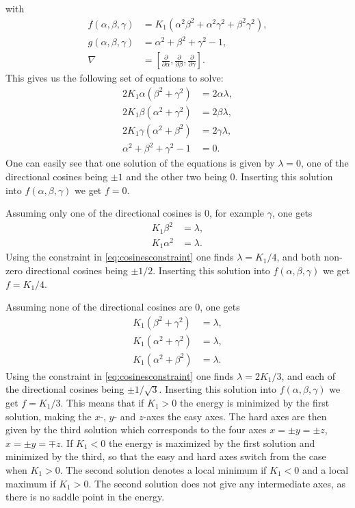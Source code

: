 \documentclass[12pt, a4paper, twoside, openright]{article}		%
\numberwithin{equation}{section}
\begin{document}
with
\begin{align}
f(\alpha, \beta, \gamma) &= K_1 (\alpha^2\beta^2+\alpha^2\gamma^2+\beta^2\gamma^2), \\
g(\alpha, \beta, \gamma) &= \alpha^2+\beta^2+\gamma^2 - 1,\\
\nabla &= \left[\frac{\partial}{\partial\alpha}, \frac{\partial}{\partial\beta}, \frac{\partial}{\partial\gamma}\right].
\end{align}
This gives us the following set of equations to solve:
\begin{align*}
2K_1\alpha (\beta^2+\gamma^2) &= 2\alpha\lambda, \\ 
2K_1\beta (\alpha^2+\gamma^2) &= 2\beta\lambda, \\ 
2K_1\gamma (\alpha^2+\beta^2) &= 2\gamma\lambda, \\ 
\alpha^2+\beta^2+\gamma^2 - 1 &= 0.
\end{align*}
One can easily see that one solution of the equations is given by $\lambda = 0$, one of the directional cosines being $\pm 1$ and the other two being 0. Inserting this solution into $f(\alpha, \beta, \gamma)$ we get $f = 0$.

Assuming only one of the directional cosines is 0, for example $\gamma$, one gets
\begin{align*}
K_1 \beta^2 &= \lambda, \\ 
K_1 \alpha^2 &= \lambda.
\end{align*}
Using the constraint in \eqref{eq:cosinesconstraint} one finds $\lambda = K_1/4$, and both non-zero directional cosines being $\pm 1/2$. Inserting this solution into $f(\alpha, \beta, \gamma)$ we get $f = K_1/4$.

Assuming none of the directional cosines are 0, one gets
\begin{align*}
K_1 (\beta^2+\gamma^2) &= \lambda, \\ 
K_1 (\alpha^2+\gamma^2) &= \lambda, \\ 
K_1 (\alpha^2+\beta^2) &= \lambda.
\end{align*}
Using the constraint in \eqref{eq:cosinesconstraint} one finds $\lambda = 2K_1/3$, and each of the directional cosines being $\pm 1/\sqrt{3}$. Inserting this solution into $f(\alpha, \beta, \gamma)$ we get $f = K_1/3$. This means that if $K_1 > 0$ the energy is minimized by the first solution, making the $x$-, $y$- and $z$-axes the easy axes. The hard axes are then given by the third solution which corresponds to the four axes $x = \pm y = \pm z$, $x = \pm y = \mp z$. If $K_1 < 0$ the energy is maximized by the first solution and minimized by the third, so that the easy and hard axes switch from the case when $K_1 > 0$. The second solution denotes a local minimum if $K_1<0$ and a local maximum if $K_1>0$. The second solution does not give any intermediate axes, as there is no saddle point in the energy.
\end{document}

